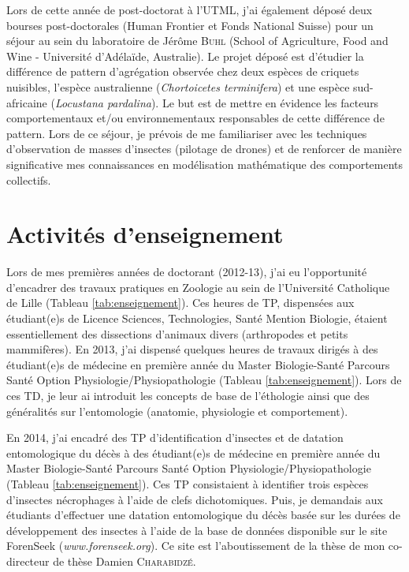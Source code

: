 \documentclass[a4paper,11pt,fleqn]{book} %
\begin{document}
Lors de cette année de post-doctorat à l'UTML, j'ai également déposé deux bourses post-doctorales (Human Frontier et Fonds National Suisse) pour un séjour au sein du laboratoire de Jérôme \textsc{Buhl} (School of Agriculture, Food and Wine - Université d'Adélaïde, Australie). Le projet déposé est d'étudier la différence de pattern d'agrégation observée chez deux espèces de criquets nuisibles, l'espèce australienne (\textit{Chortoicetes terminifera}) et une espèce sud-africaine (\textit{Locustana pardalina}). Le but est de mettre en évidence les facteurs comportementaux et/ou environnementaux responsables de cette différence de pattern. Lors de ce séjour, je prévois de me familiariser avec les techniques d'observation de masses d'insectes (pilotage de drones) et de renforcer de manière significative mes connaissances en modélisation mathématique des comportements collectifs.


\section{Activités d'enseignement}

Lors de mes premières années de doctorant (2012-13), j'ai eu l'opportunité d'encadrer des travaux pratiques en Zoologie au sein de l'Université Catholique de Lille (Tableau \ref{tab:enseignement}). Ces heures de TP, dispensées aux étudiant(e)s de Licence Sciences, Technologies, Santé Mention Biologie, étaient essentiellement des dissections d'animaux divers (arthropodes et petits mammifères). En 2013, j'ai dispensé quelques heures de travaux dirigés à des étudiant(e)s de médecine en première année du Master Biologie-Santé Parcours Santé Option Physiologie/Physiopathologie (Tableau \ref{tab:enseignement}). Lors de ces TD, je leur ai introduit les concepts de base de l'éthologie ainsi que des généralités sur l'entomologie (anatomie, physiologie et comportement).

En 2014, j'ai encadré des TP d'identification d'insectes et de datation entomologique du décès à des étudiant(e)s de médecine en première année du Master Biologie-Santé Parcours Santé Option Physiologie/Physiopathologie (Tableau \ref{tab:enseignement}). Ces TP consistaient à identifier trois espèces d'insectes nécrophages à l'aide de clefs dichotomiques. Puis, je demandais aux étudiants d'effectuer une datation entomologique du décès basée sur les durées de développement des insectes à l'aide de la base de données disponible sur le site ForenSeek (\textit{www.forenseek.org}). Ce site est l'aboutissement de la thèse de mon co-directeur de thèse Damien \textsc{Charabidzé}.
\end{document}

